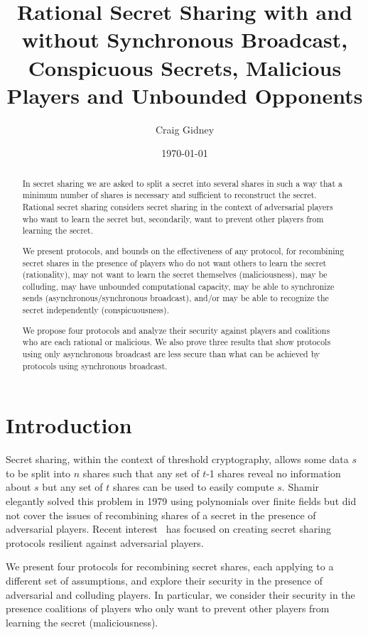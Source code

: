 \documentclass[12pt]{dalcsthesis}
\title{Rational Secret Sharing with and without Synchronous Broadcast, Conspicuous Secrets, Malicious Players and Unbounded Opponents}
\author{Craig Gidney}
\date{\today}
\begin{document}
\mcs
\nolistoftables
\frontmatter

\begin{abstract}
In secret sharing we are asked to split a secret into several shares in such a way that a minimum number of shares is necessary and sufficient to reconstruct the secret. Rational secret sharing considers secret sharing in the context of adversarial players who want to learn the secret but, secondarily, want to prevent other players from learning the secret. 

We present protocols, and bounds on the effectiveness of any protocol, for recombining secret shares in the presence of players who do not want others to learn the secret (rationality), may not want to learn the secret themselves (maliciousness), may be colluding, may have unbounded computational capacity, may be able to synchronize sends (asynchronous/synchronous broadcast), and/or may be able to recognize the secret independently (conspicuousness).

We propose four protocols and analyze their security against players and coalitions who are each rational or malicious. We also prove three results that show protocols using only asynchronous broadcast are less secure than what can be achieved by protocols using synchronous broadcast. 
\end{abstract}

\mainmatter

\chapter{Introduction}

Secret sharing, within the context of threshold cryptography, allows some data $s$ to be split into $n$ shares such that any set of $t$-1 shares reveal no information about $s$ but any set of $t$ shares can be used to easily compute $s$. Shamir~\cite{shamir79} elegantly solved this problem in 1979 using polynomials over finite fields but did not cover the issues of recombining shares of a secret in the presence of adversarial players. Recent interest~\cite{abraham06, fuch10, gordon06, kol08, maleka08, ong09} has focused on creating secret sharing protocols resilient against adversarial players.

We present four protocols for recombining secret shares, each applying to a different set of assumptions, and explore their security in the presence of adversarial and colluding players. In particular, we consider their security in the presence coalitions of players who only want to prevent other players from learning the secret (maliciousness).
\end{document}
